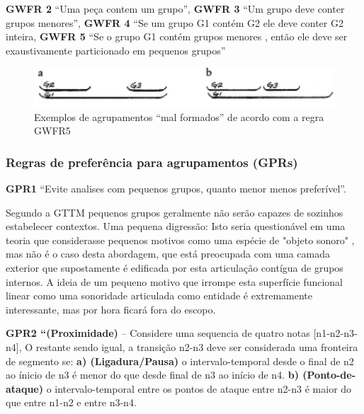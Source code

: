 \documentclass[
	12pt,				%
	openright,			%
	twoside,			%
	a4paper,			%
	english,			%
	french,				%
	spanish,			%
	brazil				%
	]{abntex2}
\begin{document}
\begin{citacao}
\textbf{GWFR 2} “Uma peça contem um grupo”, \textbf{GWFR 3} “Um grupo deve conter grupos menores”, \textbf{GWFR 4}  “Se um grupo G1 contém G2 ele deve conter G2 inteira, \textbf{GWFR 5} “Se o grupo G1 contém grupos menores , então ele deve ser exaustivamente particionado em pequenos grupos” 
 \cite[ p.38]{lerdahl1983generative}
\end{citacao}

\pagebreak
\begin{figure}[htb]
	\caption{\label{fig_grafico}Exemplos de agrupamentos “mal formados” de acordo com a regra GWFR5}
	\begin{center}
	    \includegraphics[scale=0.35]{gttm/GWFR_fig33.png}
	\end{center}
\end{figure}


\subsubsection{Regras de preferência para agrupamentos (GPRs)}

\begin{citacao}
\textbf{GPR1} “Evite analises com pequenos grupos, quanto menor menos preferível”.
\cite[ p.43]{lerdahl1983generative}
\end{citacao}

Segundo a GTTM pequenos grupos geralmente não serão capazes de sozinhos estabelecer contextos. Uma pequena digressão: Isto seria questionável em uma teoria que considerasse pequenos motivos como uma espécie de "objeto sonoro"\cite{guigue1995analise} , mas não é o caso desta abordagem, que está preocupada com uma camada exterior que supostamente é edificada por esta articulação contígua de grupos internos. A ideia de um pequeno motivo que irrompe esta superfície funcional linear como uma sonoridade\cite{guigue2012} articulada como entidade é extremamente interessante, mas por hora ficará fora do escopo.

\begin{citacao}
\textbf{GPR2 “(Proximidade)} – Considere uma sequencia de quatro notas [n1-n2-n3-n4], O restante sendo igual, a transição n2-n3 deve ser considerada uma fronteira de segmento se: \textbf{a) (Ligadura/Pausa)} o intervalo-temporal desde o final de n2 ao ínicio de n3 é menor do que desde final de n3 ao início de n4. \textbf{b) (Ponto-de-ataque)} o intervalo-temporal entre os pontos de ataque entre n2-n3 é maior do que entre n1-n2  e entre n3-n4. \cite[ p.45]{lerdahl1983generative}
\end{citacao}
\end{document}
